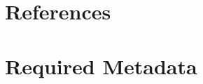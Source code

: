 \documentclass[preprint,12pt, a4paper]{elsarticle}
\begin{document}
\section*{References}


 







\section*{Required Metadata}



\end{document}
